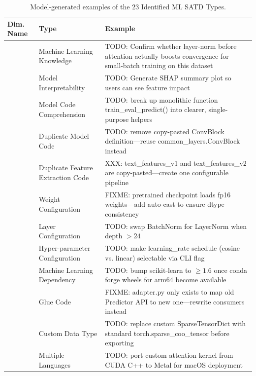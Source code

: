 
\begin{table}[ht!]
\centering
\small
\caption{Model-generated examples of the 23 Identified ML SATD Types.}
\label{tab:ml_satd_types}
\begin{tabularx}{\textwidth}{
    >{\centering\arraybackslash}p{0.8cm}
    >{\centering\arraybackslash}p{2.8cm}
    X 
}
\hline
\textbf{Dim. Name} & \textbf{Type} & \textbf{Example} \\
\hline
\multirow{4}{*}{AWR} & Machine Learning Knowledge & TODO: Confirm whether layer-norm before attention actually boosts convergence for small-batch training on this dataset \\
\cline{2-3}
 & Model Interpretability & TODO: Generate SHAP summary plot so users can see feature impact \\
\hline
\multirow{2}{*}{RDB} & Model Code Comprehension & TODO: break up monolithic function train\_eval\_predict() into clearer, single-purpose helpers \\
\hline
\multirow{4}{*}{DCE} & Duplicate Model Code & TODO: remove copy-pasted ConvBlock definition—reuse common\_layers.ConvBlock instead \\
\cline{2-3}
 & Duplicate Feature Extraction Code & XXX: text\_features\_v1 and text\_features\_v2 are copy-pasted—create one configurable pipeline \\
\hline
\multirow{6}{*}{CFO} & Weight Configuration & FIXME: pretrained checkpoint loads fp16 weights—add auto-cast to ensure dtype consistency \\
\cline{2-3}
 & Layer Configuration & TODO: swap BatchNorm for LayerNorm when depth $> 24$ \\ 
\cline{2-3}
 & Hyper-parameter Configuration & TODO: make learning\_rate schedule (cosine vs. linear) selectable via CLI flag \\
\hline
\multirow{10}{*}{CDD} & Machine Learning Dependency & TODO: bump scikit-learn to $\geq 1.6$ once conda forge wheels for arm64 become available \\  
\cline{2-3}
 & Glue Code & FIXME: adapter.py only exists to map old Predictor API to new one—rewrite consumers instead \\
\cline{2-3}
 & Custom Data Type & TODO: replace custom SparseTensorDict with standard torch.sparse\_coo\_tensor before exporting \\
\cline{2-3}
 & Multiple Languages & TODO: port custom attention kernel from CUDA C++ to Metal for macOS deployment \\

\end{tabularx}
\end{table}
